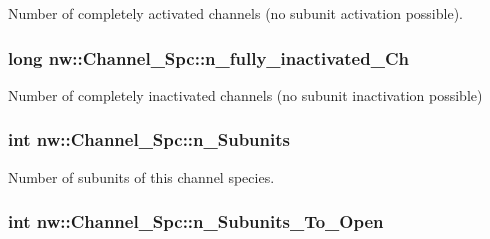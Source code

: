 Number of completely activated channels (no subunit activation possible). 

\hypertarget{classnw_1_1_channel___spc_a35afc71aa0eeb5b1e4a2089a5c1f65ae}{
\subsubsection[{n\+\_\+fully\+\_\+inactivated\+\_\+\+Ch}]{\setlength{\rightskip}{0pt plus 5cm}long nw\+::\+Channel\+\_\+\+Spc\+::n\+\_\+fully\+\_\+inactivated\+\_\+\+Ch\hspace{0.3cm}{\ttfamily [private]}}}\label{classnw_1_1_channel___spc_a35afc71aa0eeb5b1e4a2089a5c1f65ae}


Number of completely inactivated channels (no subunit inactivation possible) 

\hypertarget{classnw_1_1_channel___spc_a2b63ef7e5147046919cf96060b57e078}{
\subsubsection[{n\+\_\+\+Subunits}]{\setlength{\rightskip}{0pt plus 5cm}int nw\+::\+Channel\+\_\+\+Spc\+::n\+\_\+\+Subunits\hspace{0.3cm}{\ttfamily [private]}}}\label{classnw_1_1_channel___spc_a2b63ef7e5147046919cf96060b57e078}


Number of subunits of this channel species. 

\hypertarget{classnw_1_1_channel___spc_a52e6e8aae67ebfb6cec1b79e7f125542}{
\subsubsection[{n\+\_\+\+Subunits\+\_\+\+To\+\_\+\+Open}]{\setlength{\rightskip}{0pt plus 5cm}int nw\+::\+Channel\+\_\+\+Spc\+::n\+\_\+\+Subunits\+\_\+\+To\+\_\+\+Open\hspace{0.3cm}{\ttfamily [private]}}}\label{classnw_1_1_channel___spc_a52e6e8aae67ebfb6cec1b79e7f125542}


